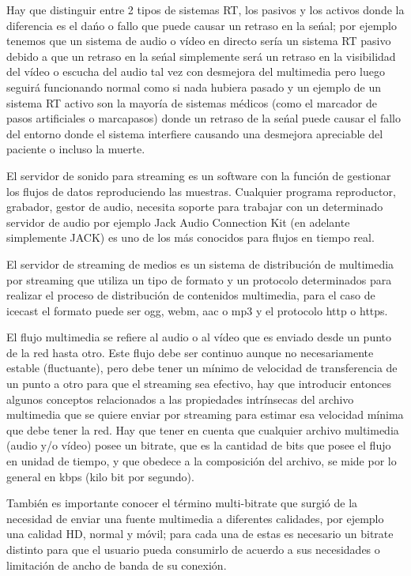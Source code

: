 \begin{multicols}{2}
Hay que distinguir entre 2 tipos de sistemas RT, los pasivos y los activos donde la diferencia es el dańo o fallo que puede causar un retraso en la seńal; por ejemplo tenemos que un sistema de audio o vídeo en directo sería un sistema RT pasivo debido a que un retraso en la seńal simplemente será un retraso en la visibilidad del vídeo o escucha del audio tal vez con desmejora del multimedia pero luego seguirá funcionando normal como si nada hubiera pasado y un ejemplo de un sistema RT activo son la mayoría de sistemas médicos (como el marcador de pasos artificiales o marcapasos) donde un retraso de la seńal puede causar el fallo del entorno donde el sistema interfiere causando una desmejora apreciable del paciente o incluso la muerte.

El servidor de sonido para streaming es un software con la función de gestionar los flujos de datos 
reproduciendo las muestras. Cualquier programa reproductor, grabador, gestor de audio, necesita soporte para trabajar con un determinado servidor de audio por ejemplo Jack Audio Connection Kit (en adelante simplemente JACK) es uno de los más conocidos para flujos en tiempo real.

El servidor de streaming de medios es un sistema de distribución de multimedia por streaming que utiliza un tipo de formato y un protocolo determinados para realizar el proceso de distribución de contenidos multimedia, para el caso de icecast el formato puede ser ogg, webm, aac o mp3 y el protocolo http o https.

El flujo multimedia se refiere al audio o al vídeo que es enviado desde un punto de la red hasta otro. Este flujo debe ser continuo aunque no necesariamente estable (fluctuante), pero debe tener un mínimo de velocidad de transferencia de un punto a otro para que el streaming sea efectivo, hay que introducir entonces algunos conceptos relacionados a las propiedades intrínsecas del archivo multimedia que se quiere enviar por streaming para estimar esa velocidad mínima que debe tener la red. Hay que tener en cuenta que cualquier archivo multimedia (audio y/o vídeo) posee un bitrate, que es la cantidad de bits que posee el flujo en unidad de tiempo, y que obedece a la composición del archivo, se mide por lo general en kbps (kilo bit por segundo).

También es importante conocer el término multi-bitrate que surgió de la necesidad de enviar una fuente multimedia a diferentes calidades, por ejemplo una calidad HD, normal y móvil; para cada una de estas es necesario un bitrate distinto para que el usuario pueda consumirlo de acuerdo a sus necesidades o limitación de ancho de banda de su conexión.


\end{multicols}
